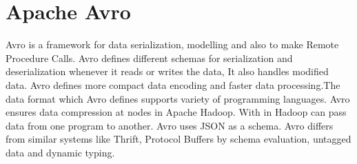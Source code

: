 \section{Apache Avro}

Avro \cite{hid-sp18-421-AvroCloud} is a framework for data serialization,
modelling and also to make Remote Procedure Calls. Avro defines different
schemas for serialization and deserialization whenever it reads or writes the
data, It also handles modified data. Avro defines more compact data encoding and
faster data processing.The data format which Avro defines supports variety of
programming languages. Avro ensures data compression at nodes in Apache Hadoop.
With in Hadoop can pass data from one program to another. Avro uses JSON as a
schema. Avro differs from similar systems like Thrift, Protocol Buffers by
schema evaluation, untagged data and dynamic typing.


